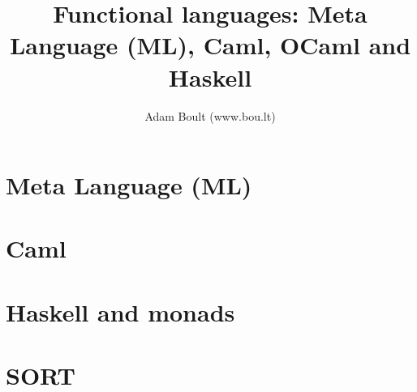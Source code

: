 \documentclass[oneside]{book}
\begin{document}
\author{Adam Boult (www.bou.lt)}
\title{Functional languages: Meta Language (ML), Caml, OCaml and Haskell}
\maketitle

\setcounter{tocdepth}{0}
\tableofcontents



\part{Meta Language (ML)}

\part{Caml}

\part{Haskell and monads}

\part{SORT}

\end{document}

